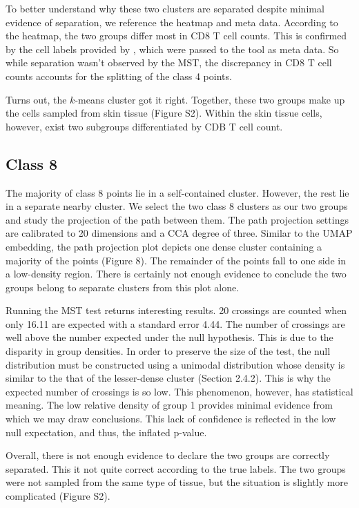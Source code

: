 \documentclass{article}
\begin{document}
{To better understand why these two clusters are separated despite minimal evidence of separation, we reference the heatmap and meta data. According to the heatmap, the two groups differ most in CD8 T cell counts. This is confirmed by the cell labels provided by \cite{UMAP_example}, which were passed to the tool as meta data. So while separation wasn't observed by the MST, the discrepancy in CD8 T cell counts accounts for the splitting of the class 4 points.

Turns out, the $k$-means cluster got it right. Together, these two groups make up the cells sampled from skin tissue (Figure S2). Within the skin tissue cells, however, exist two subgroups differentiated by CDB T cell count.

\subsection{Class 8}
The majority of class 8 points lie in a self-contained cluster. However, the rest lie in a separate nearby cluster. We select the two class 8 clusters as our two groups and study the projection of the path between them. The path projection settings are calibrated to 20 dimensions and a CCA degree of three. Similar to the UMAP embedding, the path projection plot depicts one dense cluster containing a majority of the points (Figure 8). The remainder of the points fall to one side in a low-density region. There is certainly not enough evidence to conclude the two groups belong to separate clusters from this plot alone.

Running the MST test returns interesting results. 20 crossings are counted when only 16.11 are expected with a standard error 4.44. The number of crossings are well above the number expected under the null hypothesis. This is due to the disparity in group densities. In order to preserve the size of the test, the null distribution must be constructed using a unimodal distribution whose density is similar to the that of the lesser-dense cluster (Section 2.4.2). This is why the expected number of crossings is so low. This phenomenon, however, has statistical meaning. The low relative density of group 1 provides minimal evidence from which we may draw conclusions. This lack of confidence is reflected in the low null expectation, and thus, the inflated p-value.

Overall, there is not enough evidence to declare the two groups are correctly separated. This it not quite correct according to the true labels. The two groups were not sampled from the same type of tissue, but the situation is slightly more complicated (Figure S2).

}
\end{document}
